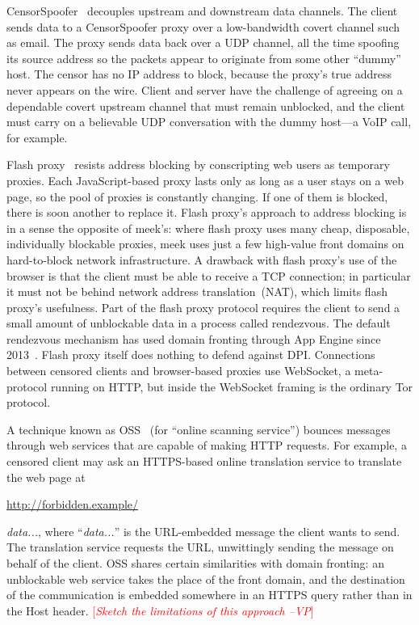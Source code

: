\documentclass{sig-alternate}
\newcommand{\meek}{meek\xspace}
\def\urll#1{\begin{NoHyper}\url{#1}\end{NoHyper}}
\newcommand{\note}[1]{{\textcolor{red}{[\textit{#1}]}}}
\newcommand{\vp}[1]{\note{#1 --VP}}
\begin{document}
CensorSpoofer~\cite{censorspoofer}
decouples upstream and downstream data channels.
The client sends data to a CensorSpoofer proxy over a low-bandwidth covert channel such as email.
The proxy sends data back over a UDP channel, all the time
spoofing its source address so the packets appear to originate from some other ``dummy'' host.
The censor has no IP address to block, because the proxy's true address never appears on the wire.
Client and server have the challenge of agreeing on a dependable covert upstream channel
that must remain unblocked,
and the client must carry on a believable UDP conversation with the dummy host---a
VoIP call, for example.

Flash proxy~\cite{flashproxy} resists address blocking by
conscripting web users as temporary proxies.
Each JavaScript-based proxy lasts only as long as a
user stays on a web page, so the pool of proxies is constantly changing.
If one of them is blocked, there is soon another to replace it.
Flash proxy's approach to address blocking is in a sense
the opposite of \meek's:
where flash proxy uses many cheap, disposable, individually blockable proxies,
\meek uses just a few high-value front domains on hard-to-block network infrastructure.
A drawback with flash proxy's use of the browser is that
the client must be able to receive a TCP connection; in particular it
must not be behind network address translation~(NAT), which limits flash proxy's usefulness.
Part of the flash proxy protocol requires the client to send
a small amount of unblockable data in a process called rendezvous.
The default rendezvous mechanism has used domain fronting through App Engine since 2013~\cite{flashproxy-reg-appspot}.
Flash proxy itself does nothing to defend against DPI.
Connections between censored clients and browser-based proxies use
WebSocket, a meta-protocol running on HTTP,
but inside the WebSocket framing is the ordinary Tor protocol.

A technique known as OSS~\cite{oss} (for
``online scanning service'') bounces messages
through web services that are capable of making HTTP requests.
For example, a censored client may ask an HTTPS-based online translation service to
translate the web page at \urll{http://forbidden.example/}\textsl{data...},
where ``\textsl{data...}'' is the URL-embedded message the client wants to send.
The translation service requests the URL,
unwittingly sending the message on behalf of the client.
OSS shares certain similarities with domain fronting:
an unblockable web service takes the place of the front domain,
and the destination of the communication is embedded somewhere in an HTTPS query
rather than in the Host header.
\vp{Sketch the limitations of this approach}
\end{document}

